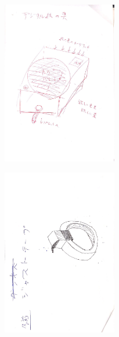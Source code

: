 \documentclass{funthesis}
\begin{document}
\begin{figure}[H]
 \begin{minipage}{0.47\hsize}
 \begin{center}
\includegraphics[width=50mm]{figures/group9.jpg}
 \end{center}
 \label{fig:seven}
 \end{minipage}
 \begin{minipage}{0.47\hsize}
 \begin{center}
 \includegraphics[width=50mm]{figures/group10.jpg}
 \end{center}
 \label{fig:eight}
 \end{minipage}
\end{figure}
\end{document}
